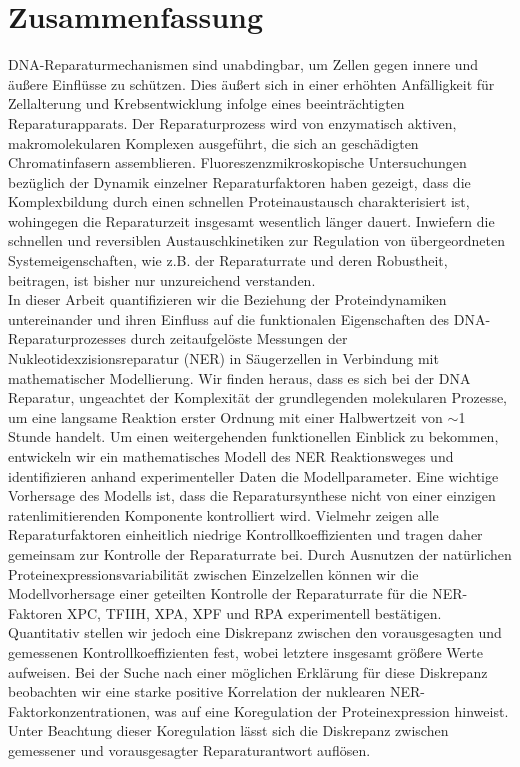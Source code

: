 \chapter*{Zusammenfassung}
\thispagestyle{plain2}


DNA-Reparaturmechanismen sind unabdingbar, um Zellen gegen innere und \"{a}u\ss{}ere Einfl\"{u}sse zu sch\"{u}tzen. Dies \"{a}u\ss{}ert sich in einer erh\"{o}hten Anf\"{a}lligkeit f\"{u}r Zellalterung und Krebsentwicklung infolge eines beeintr\"{a}chtigten Reparaturapparats. Der Reparaturprozess wird von enzymatisch aktiven, makromolekularen Komplexen ausgef\"{u}hrt, die sich an gesch\"{a}digten Chromatinfasern assemblieren. Fluoreszenzmikroskopische Untersuchung\-en bez\"{u}glich der Dynamik einzelner Reparaturfaktoren haben gezeigt, dass die Komplexbildung durch einen schnellen Proteinaustausch charakterisiert ist, wohingegen die Reparaturzeit insgesamt wesentlich l\"{a}nger dauert. Inwiefern die schnellen und reversiblen Austauschkinetiken zur Regulation von \"{u}bergeordneten Systemeigenschaften, wie z.B. der Reparaturrate und deren Robustheit, beitragen, ist bisher nur unzureichend verstanden.\\
In dieser Arbeit quantifizieren wir die Beziehung der Proteindynamiken untereinander und ihren Einfluss auf die funktionalen Eigenschaften des DNA-Reparaturprozesses durch zeitaufgel\"{o}ste Messungen der Nukleotidexzisionsreparatur (NER) in S\"{a}ugerzellen in Verbindung mit mathematischer Modellierung. Wir finden heraus, dass es sich bei der DNA Reparatur, ungeachtet der Komplexit\"{a}t der grundlegenden molekularen Prozesse, um eine langsame Reaktion erster Ordnung mit einer Halb\-wertzeit von $\sim$1 Stunde handelt. 
Um einen weitergehenden funktionellen Einblick zu bekommen, entwickeln wir ein ma\-the\-matisches Modell des NER Reaktionsweges und identifizieren anhand experimenteller Daten die Modellparameter. Eine wichtige Vorhersage des Modells ist, dass die Reparatursynthese nicht von einer einzigen ratenlimitierenden Komponente kontrolliert wird. Vielmehr zeigen alle Reparaturfaktoren einheitlich niedrige Kontroll\-koeffizienten und tragen daher gemeinsam zur Kontrolle der Reparaturrate bei. Durch Ausnutzen der nat\"{u}rlichen Proteinexpressionsvariabilit\"{a}t zwischen Einzelzellen k\"{o}nnen wir die Modell\-vorhersage einer geteilten Kontrolle der Reparaturrate f\"{u}r die NER-Faktoren XPC, TFIIH, XPA, XPF und RPA experimentell best\"{a}tigen. Quantitativ stellen wir jedoch eine Diskrepanz zwischen den vorausgesagten und gemessenen Kontrollkoeffizienten fest, wobei letztere insgesamt gr\"{o}\ss{}ere Werte aufweisen. Bei der Suche nach einer m\"{o}glichen Erkl\"{a}rung f\"{u}r diese Diskrepanz beobachten wir eine starke positive Korrelation der nu\-klearen NER-Faktorkonzentrationen, was auf eine Kore\-gulation der Proteinexpression hinweist. Unter Beachtung dieser Koregulation l\"{a}sst sich die Diskrepanz zwischen gemessener und vorausgesagter Reparaturantwort aufl\"{o}sen.\\              
